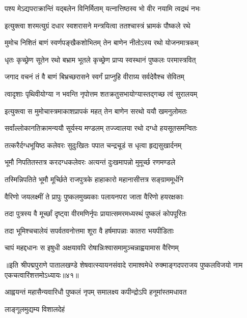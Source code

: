 \twolineshloka
{पश्य मेऽद्यपराक्रान्तिं यद्बलेन विनिर्मिताम्}
{यत्नात्तिष्ठस्व भो वीर नयामि त्वद्रथं नभः}%

\twolineshloka
{इत्युक्त्वा शरमत्युग्रं दधार स्वशरासने}
{मन्त्रयित्वा ततश्चास्त्रं भ्रामकं पौष्कले रथे}%

\twolineshloka
{मुमोच निशितं बाणं स्वर्णपङ्खैकशोभितम्}
{तेन बाणेन नीतोऽस्य रथो योजनमात्रकम्}%

\twolineshloka
{धृतः कृच्छ्रेण सूतेन रथो बभ्राम भूतले}
{कृच्छ्रेण प्राप्य स्वस्थानं पुष्कलः परमास्त्रवित्}%

\twolineshloka
{जगाद वचनं तं वै बाणं बिभ्रच्छरासने}
{स्वर्गं प्राप्नुहि वीराग्र्य सर्वदेवैश्च सेवितम्}%

\twolineshloka
{त्वादृशाः पृथिवीयोग्या न भवन्ति नृपोत्तम}
{शतक्रतुसभायोग्यास्तद्गच्छ त्वं सुरालयम्}%

\twolineshloka
{इत्युक्त्वा स मुमोचास्त्रमाकाशप्रापकं महत्}
{तेन बाणेन सरथो ययौ खमनुलोमतः}%

\twolineshloka
{सर्वांल्लोकानतिक्रामन्ययौ सूर्यस्य मण्डलम्}
{तज्ज्वालया रथो दग्धो हयसूतसमन्वितः}%

\twolineshloka
{तत्करैर्दग्धभूयिष्ठ कलेवरः सुदुःखितः}
{पपात चन्द्रचूडं स धृत्वा हृद्यसुखार्दनम्}%

\twolineshloka
{भूमौ निपतितस्तत्र करदग्धकलेवरः}
{अत्यन्तं दुःखमापन्नो मुमूर्च्छ रणमण्डले}%

\twolineshloka
{तस्मिन्निपतिते भूमौ मूर्च्छिते राजपुत्रके}
{हाहाकारो महानासीत्तत्र सङ्ग्राममूर्धनि}%

\twolineshloka
{वैरिणो जयलक्ष्मीं ते प्रापुः पुष्कलमुख्यकाः}
{पलायनपरा जाता वैरिणो हयरक्षकाः}%

\twolineshloka
{तदा पुत्रस्य वै मूर्च्छां दृष्ट्वा वीरमणिर्नृपः}
{प्रायात्समरमध्यस्थं पुष्कलं कोपपूरितः}%

\twolineshloka
{तदा भूमिश्चचालेयं सपर्वतवनोत्तमा}
{शूरा वै हर्षमापन्नाः कातरा भयपीडिताः}%

\twolineshloka
{चापं महद्दधानः स इषुधी अक्षयावपि}
{रोषान्निःश्वासमामुञ्चन्नाह्वयामास वैरिणम्}%

॥इति श्रीपद्मपुराणे पातालखण्डे शेषवात्स्यायनसंवादे रामाश्वमेधे रुक्माङ्गदपराजय पुष्कलविजयो नाम एकचत्वारिंशत्तमोऽध्यायः॥४१॥



\twolineshloka
{आह्वयन्तं महासैन्यवारिधौ पुष्कलं नृपम्}
{समालक्ष्य कपीन्द्रोऽपि हनूमांस्तमधावत}%

लाङ्गूलमुद्यम्य विशालदेहं

